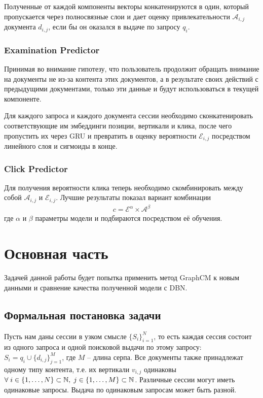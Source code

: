 \documentclass[diploma]{nanolab2015}
\begin{document}
Полученные от каждой компоненты векторы конкатенируются в один, который пропускается через полносвязные слои и дает оценку привлекательности $\mathcal{A}_{i,j}$ документа $d_{i,j}$, если бы он оказался в выдаче по запросу ${q_i}$.

\subsection{Examination Predictor}
Принимая во внимание гипотезу, что пользователь продолжит обращать внимание на документы не из-за контента этих документов, а в результате своих действий с предыдущими документами, только эти данные и будут использоваться в текущей компоненте.

Для каждого запроса и каждого документа сессии необходимо сконкатенировать соответствующие им эмбеддинги позиции, вертикали и клика, после чего пропустить их через GRU и превратить в оценку вероятности $\mathcal{E}_{i,j}$ посредством линейного слоя и сигмоиды в конце.

\subsection{Click Predictor}
Для получения вероятности клика теперь необходимо скомбинировать между собой $\mathcal{A}_{i,j}$ и $\mathcal{E}_{i,j}$. Лучшие результаты показал вариант комбинации
\begin{align}
    c = \mathcal{E}^\alpha \times \mathcal{A}^\beta
\end{align}
где $\alpha$ и $\beta$ параметры модели и подбираются посредством её обучения.
\chapter{Основная часть}
Задачей данной работы будет попытка применить метод GraphCM к новым данными и сравнение качества полученной модели с DBN.
\section{Формальная постановка задачи}
Пусть нам даны сессии в узком смысле $\{S_i\}_{i=1}^N$, то есть каждая сессия состоит из одного запроса и одной поисковой выдачи по этому запросу: $S_i = q_i \cup \{d_{i,j}\}_{j=1}^M$, где $M$ -- длина серпа. Все документы также принадлежат одному типу контента, т.е. их вертикали $v_{i,j}$ одинаковы $\forall \; \space i \in \{1, \dots, N\} \subset \mathbb{N}, \; j \in \{1, \dots, M\} \subset \mathbb{N}$. Различные сессии могут иметь одинаковые запросы. Выдача по одинаковым запросам может быть разной.
\end{document}
